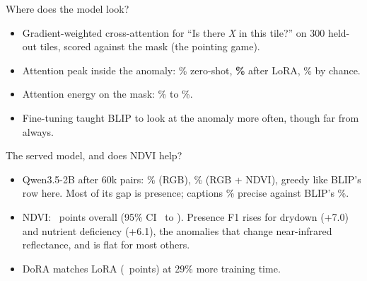 \documentclass[aspectratio=169,10pt,t]{beamer}
\begin{document}
\begin{frame}{Where does the model look?}
\begin{itemize}
\item Gradient-weighted cross-attention for ``Is there \emph{X} in this tile?'' on 300 held-out tiles, scored against the mask (the pointing game).
\item Attention peak inside the anomaly: \pointZero\% zero-shot, \textbf{\pointLora\%} after LoRA, \pointChance\% by chance.
\item Attention energy on the mask: \energyZero\% to \energyLora\%.
\item Fine-tuning taught BLIP to look at the anomaly more often, though far from always.
\end{itemize}
\end{frame}

\begin{frame}{The served model, and does NDVI help?}
\centering
\resizebox{\textwidth}{!}{}
\begin{itemize}
\item Qwen3.5-2B after 60k pairs: \qwenRgbMean\% (RGB), \qwenNdviMean\% (RGB + NDVI), greedy like BLIP's row here. Most of its gap is presence; captions \qwenNdviPrecision\% precise against BLIP's \blipFoldPrecision\%.
\item NDVI: \ndviDiff\ points overall (95\% CI \ndviLo\ to \ndviHi). Presence F1 rises for drydown (+7.0) and nutrient deficiency (+6.1), the anomalies that change near-infrared reflectance, and is flat for most others.
\item DoRA matches LoRA (\doraDiff\ points) at 29\% more training time.
\end{itemize}
\end{frame}
\end{document}
